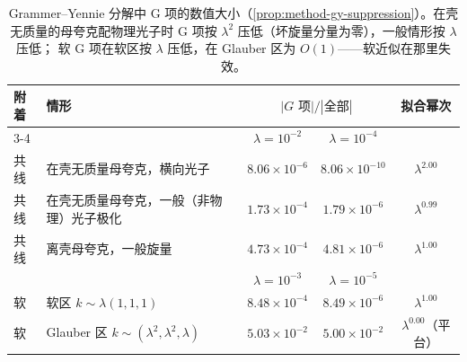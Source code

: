 \begin{table}[htbp]
\centering
\small
\renewcommand{\arraystretch}{1.2}
\begin{tabular}{@{}llccc@{}}
\toprule
附着 & 情形 & \multicolumn{2}{c}{$|G\text{ 项}|/|\text{全部}|$} & 拟合幂次\\
\cmidrule(lr){3-4}
& & $\lambda=10^{-2}$ & $\lambda=10^{-4}$ & \\
\midrule
共线 & 在壳无质量母夸克，横向光子 & $8.06\times10^{-6}$ & $8.06\times10^{-10}$ & $\lambda^{2.00}$\\
共线 & 在壳无质量母夸克，一般（非物理）光子极化 & $1.73\times10^{-4}$ & $1.79\times10^{-6}$ & $\lambda^{0.99}$\\
共线 & 离壳母夸克，一般旋量 & $4.73\times10^{-4}$ & $4.81\times10^{-6}$ & $\lambda^{1.00}$\\
\midrule
& & $\lambda=10^{-3}$ & $\lambda=10^{-5}$ & \\
\midrule
软 & 软区 $k\sim\lambda(1,1,1)$ & $8.48\times10^{-4}$ & $8.49\times10^{-6}$ & $\lambda^{1.00}$\\
软 & Glauber 区 $k\sim(\lambda^2,\lambda^2,\lambda)$ & $5.03\times10^{-2}$ & $5.00\times10^{-2}$ & $\lambda^{0.00}$（平台）\\
\bottomrule
\end{tabular}
\caption{Grammer--Yennie 分解中 G 项的数值大小（\cref{prop:method-gy-suppression}）。在壳无质量的母夸克配物理光子时 G 项按 $\lambda^2$ 压低（坏旋量分量为零），一般情形按 $\lambda$ 压低；
软 G 项在软区按 $\lambda$ 压低，在 Glauber 区为 $O(1)$——软近似在那里失效。}
\label{tab:appF-gy}
\end{table}
